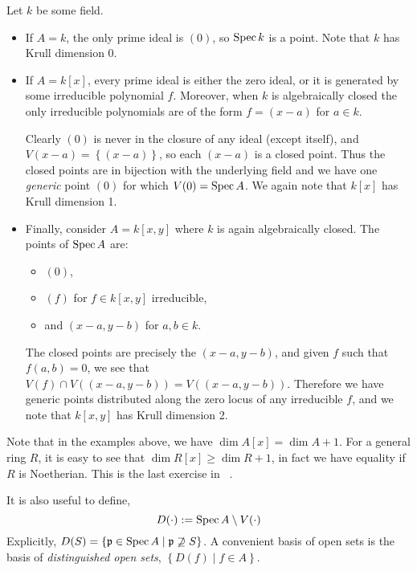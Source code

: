 \documentclass[000-main.tex]{subfiles}
\begin{document}
\begin{example}
  Let $k$ be some field.
  \begin{itemize}
    \item If $A = k$, the only prime ideal is $(0)$, so $\operatorname{Spec} k$ is a point. Note that $k$ has Krull dimension 0.
    \item If $A = k[x]$, every prime ideal is either the zero ideal, or it is generated by some irreducible polynomial $f$.
    Moreover, when $k$ is algebraically closed the only irreducible polynomials are of the form $f = (x-a)$ for $a \in k$.

    Clearly $(0)$ is never in the closure of any ideal (except itself), and $V(x-a) = \left\{(x-a)\right\}$, so each $(x-a)$ is a closed point.%
    Thus the closed points are in bijection with the underlying field and we have one \emph{generic} point $(0)$ for which $V(0) = \operatorname{Spec} A$.
    We again note that $k[x]$ has Krull dimension 1.

    \item Finally, consider $A = k[x,y]$ where $k$ is again algebraically closed.
    The points of $\operatorname{Spec} A$ are:
    \begin{itemize}
			\item $(0)$,
			\item  $(f)$ for $f \in k[x, y]$ irreducible,
			\item  and $(x-a, y-b)$ for $a,b \in k$.
    \end{itemize}
    The closed points are precisely the $(x-a, y-b)$, and given $f$ such that $f(a,b)=0$, we see that $V(f) \cap V((x-a, y-b)) = V((x-a, y-b))$.
    Therefore we have generic points distributed along the zero locus of any irreducible $f$, and we note that $k[x, y]$ has Krull dimension 2.
  \end{itemize}
\end{example}

\begin{remark}
  Note that in the examples above, we have $\dim A[x] = \dim A + 1$.
  For a general ring $R$, it is easy to see that $\dim R[x] \geq \dim R + 1$, in fact we have equality if $R$ is Noetherian.
  This is the last exercise in \citeauthor{atiyahIntroductionCommutativeAlgebra2000}~\cite{atiyahIntroductionCommutativeAlgebra2000}.
\end{remark}

It is also useful to define,
\begin{displaymath}
  D(\cdot) := \operatorname{Spec} A\setminus V(\cdot)
\end{displaymath}
Explicitly, $D(S) = \left\{ \mathfrak{p}\in\operatorname{Spec} A \mid \mathfrak{p}\not\supseteq S \right\}$.
A convenient basis of open sets is the basis of \emph{distinguished open sets}, $\left\{ D(f) \mid f\in A \right\}$.
\end{document}
